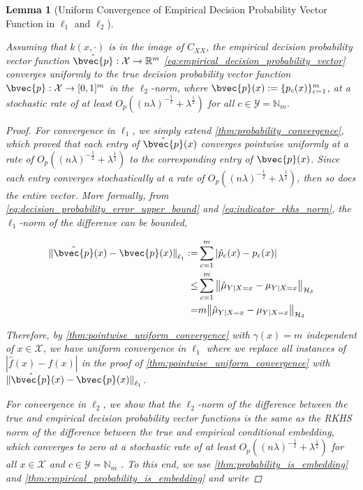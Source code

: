 \documentclass{article}
\newtheorem{lemma}[theorem]{Lemma}
\begin{document}
	\begin{lemma}[Uniform Convergence of Empirical Decision Probability Vector Function in $\ell_{1}$ and $\ell_{2}$]
	\label{thm:probability_vector_convergence} 
	
		Assuming that $k(x, \cdot)$ is in the image of $C_{XX}$, the empirical decision probability vector function $\hat{\bvec{p}} : \mathcal{X} \to \mathbb{R}^{m}$ \eqref{eq:empirical_decision_probability_vector} converges uniformly to the true decision probability vector function $\bvec{p} : \mathcal{X} \to [0, 1]^{m}$ in the $\ell_{2}$-norm, where $\bvec{p}(x) := \{p_{c}(x)\}_{c = 1}^{m}$, at a stochastic rate of at least $O_{p}((n \lambda)^{-\frac{1}{2}} + \lambda^{\frac{1}{2}})$ for all $c \in \mathcal{Y} = \mathbb{N}_{m}$.
		
		\begin{proof}
			For convergence in $\ell_{1}$, we simply extend \cref{thm:probability_convergence}, which proved that each entry of $\hat{\bvec{p}}(x)$ converges pointwise uniformly at a rate of $O_{p}((n \lambda)^{-\frac{1}{2}} + \lambda^{\frac{1}{2}})$ to the corresponding entry of $\bvec{p}(x)$. Since each entry converges stochastically at a rate of $O_{p}((n \lambda)^{-\frac{1}{2}} + \lambda^{\frac{1}{2}})$, then so does the entire vector. More formally, from \eqref{eq:decision_probability_error_upper_bound} and \eqref{eq:indicator_rkhs_norm}, the $\ell_{1}$-norm of the difference can be bounded,
			
			\begin{equation}
			\begin{aligned}
				{\lVert \hat{\bvec{p}}(x) - \bvec{p}(x) \rVert}_{\ell_{1}} :=& \sum_{c = 1}^{m} | \hat{p}_{c}(x) - p_{c}(x) | \\
				\leq& \sum_{c = 1}^{m} \big\| \hat{\mu}_{Y | X = x} - \mu_{Y | X = x} \big\|_{\mathcal{H}_{\delta}} \\
				=& m \big\| \hat{\mu}_{Y | X = x} - \mu_{Y | X = x} \big\|_{\mathcal{H}_{\delta}}
			\end{aligned}
			\end{equation}
			
			Therefore, by \cref{thm:pointwise_uniform_convergence} with $\gamma(x) = m$ independent of $x \in \mathcal{X}$, we have uniform convergence in $\ell_{1}$ where we replace all instances of $| \hat{f}(x) - f(x) |$ in the proof of \cref{thm:pointwise_uniform_convergence} with ${\lVert \hat{\bvec{p}}(x) - \bvec{p}(x) \rVert}_{\ell_{1}}$.
			
			For convergence in $\ell_{2}$, we show that the $\ell_{2}$-norm of the difference between the true and empirical decision probability vector functions is the same as the RKHS norm of the difference between the true and empirical conditional embedding, which converges to zero at a stochastic rate of at least $O_{p}((n \lambda)^{-\frac{1}{2}} + \lambda^{\frac{1}{2}})$ for all $x \in \mathcal{X}$ and $c \in \mathcal{Y} = \mathbb{N}_{m}$ \citep{song2009hilbert}. To this end, we use \cref{thm:probability_is_embedding} and \cref{thm:empirical_probability_is_embedding} and write 
			

\end{proof}
\end{lemma}
\end{document}
